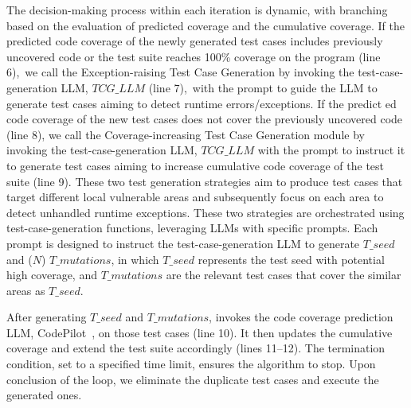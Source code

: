 The decision-making process within each iteration is dynamic, with
branching based on the evaluation of predicted coverage and the
cumulative coverage. If the predicted code coverage of the newly
generated test cases includes previously uncovered code or the test
suite reaches 100\% coverage on the program (line 6),~we call the
Exception-raising Test Case Generation by invoking the
test-case-generation LLM, $TCG\_LLM$ (line 7),~with the prompt to
guide the LLM to generate test cases aiming to detect runtime
errors/exceptions. If the predict ed code coverage of the new test
cases does not cover the previously uncovered code (line 8), we call
the Coverage-increasing Test Case Generation module by invoking the
test-case-generation LLM, $TCG\_LLM$ with the prompt to instruct it to
generate test cases aiming to increase cumulative code coverage of the
test suite (line 9). These two test generation strategies aim to
produce test cases that target different local vulnerable areas and
subsequently focus on each area to detect unhandled runtime
exceptions. These two strategies are orchestrated using
test-case-generation functions, leveraging LLMs with specific
prompts. Each prompt is designed to instruct the test-case-generation
LLM to generate $T\_seed$ and ($N$) $T\_mutations$, in which $T\_seed$
represents the test seed with potential high coverage, and
$T\_mutations$ are the relevant test cases that cover the similar
areas as $T\_seed$.

After generating $T\_seed$ and $T\_mutations$, {\tool} invokes the
code coverage prediction LLM, CodePilot~\cite{forge24}, on those test
cases (line 10). It then updates the cumulative coverage and extend
the test suite accordingly (lines 11--12). The termination condition,
set to a specified time limit, ensures the algorithm to stop. Upon
conclusion of the loop, we eliminate the duplicate test cases and
execute the generated ones.



